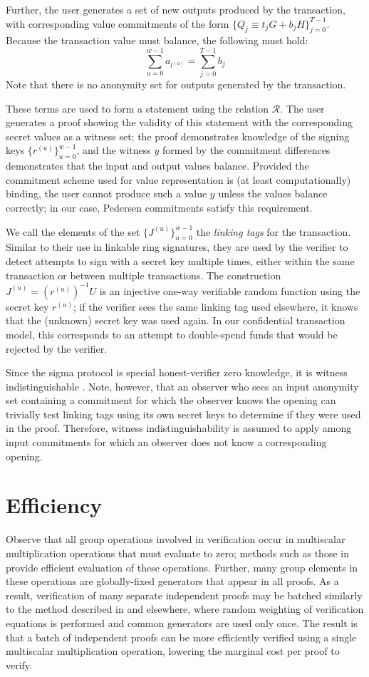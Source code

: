 \documentclass{article}
\theoremstyle{definition}
\begin{document}
Further, the user generates a set of new outputs produced by the transaction, with corresponding value commitments of the form $\{Q_j \equiv t_jG + b_jH\}_{j=0}^{T-1}$.
Because the transaction value must balance, the following must hold: $$\sum_{u=0}^{w-1} a_{l^{(u)}} = \sum_{j=0}^{T-1} b_j$$
Note that there is no anonymity set for outputs generated by the transaction.

These terms are used to form a statement using the relation $\mathcal{R}$.
The user generates a proof showing the validity of this statement with the corresponding secret values as a witness set; the proof demonstrates knowledge of the signing keys $\{r^{(u)}\}_{u=0}^{w-1}$, and the witness $y$ formed by the commitment differences demonstrates that the input and output values balance.
Provided the commitment scheme used for value representation is (at least computationally) binding, the user cannot produce such a value $y$ unless the values balance correctly; in our case, Pedersen commitments satisfy this requirement.

We call the elements of the set $\{J^{(u)}\}_{u=0}^{w-1}$ the \textit{linking tags} for the transaction.
Similar to their use in linkable ring signatures, they are used by the verifier to detect attempts to sign with a secret key multiple times, either within the same transaction or between multiple transactions.
The construction $J^{(u)} = (r^{(u)})^{-1}U$ is an injective one-way verifiable random function \cite{dodis} using the secret key $r^{(u)}$; if the verifier sees the same linking tag used elsewhere, it knows that the (unknown) secret key was used again.
In our confidential transaction model, this corresponds to an attempt to double-spend funds that would be rejected by the verifier.

Since the sigma protocol is special honest-verifier zero knowledge, it is witness indistinguishable \cite{cramer}.
Note, however, that an observer who sees an input anonymity set containing a commitment for which the observer knows the opening can trivially test linking tags using its own secret keys to determine if they were used in the proof.
Therefore, witness indistinguishability is assumed to apply among input commitments for which an observer does not know a corresponding opening.


\section{Efficiency}
Observe that all group operations involved in verification occur in multiscalar multiplication operations that must evaluate to zero; methods such as those in \cite{straus,pippenger} provide efficient evaluation of these operations.
Further, many group elements in these operations are globally-fixed generators that appear in all proofs.
As a result, verification of many separate independent proofs may be batched similarly to the method described in \cite{bulletproofs} and elsewhere, where random weighting of verification equations is performed and common generators are used only once.
The result is that a batch of independent proofs can be more efficiently verified using a single multiscalar multiplication operation, lowering the marginal cost per proof to verify.
\end{document}
